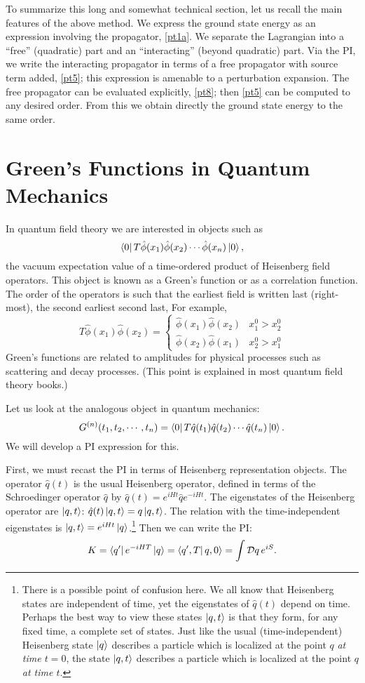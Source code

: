 \documentclass[12pt]{article}
\begin{document}
To summarize this long and somewhat technical
section, let us recall the main features of the
above method. We express the ground state energy as an expression
involving the propagator, \eqref{pt1a}. We separate the Lagrangian into
a ``free'' (\ie quadratic) part and an ``interacting'' (beyond
quadratic) part. Via the PI,
we write the interacting propagator in terms of a
free propagator with source term added, \eqref{pt5}; this expression
is amenable to a perturbation expansion. The free propagator can be
evaluated explicitly, \eqref{pt8}; then \eqref{pt5}
can be computed to any desired order. From this we obtain directly
the ground state energy to the same order.

\section{Green's Functions in Quantum Mechanics}

In quantum field theory we are interested in objects such as
\[
\left\langle0\right|T\hat\phi(x_1)\hat\phi(x_2)\cdots\hat\phi(x_n)\left|0\right\rangle,
\]
the vacuum expectation value of a time-ordered product of Heisenberg
field operators. This object is known as a Green's function or as a
correlation function. The order of the operators is such that the
earliest field is written last (right-most), the second earliest
second last, \etc For example,
\[ T\hat\phi(x_1)\hat\phi(x_2)=\left\{\begin{array}{rl}
\hat\phi(x_1)\hat\phi(x_2)&x_1^0>x_2^0\\
\hat\phi(x_2)\hat\phi(x_1)&x_2^0>x_1^0\end{array}\right.
\]
Green's functions are related to amplitudes for physical processes
such as scattering and decay processes. (This point is explained in
most quantum field theory books.)

Let us look at the analogous object in quantum mechanics:
\[ G^{(n)}(t_1,t_2,\cdots,t_n)=\left\langle0\right|
T\hat q(t_1)\hat q(t_2)\cdots\hat q(t_n)\left|0\right\rangle.
\]
We will develop a PI expression for this. 

First, we must recast the PI
in terms of Heisenberg representation objects. The operator
$\hat q(t)$ is the usual Heisenberg operator, defined in terms of the
Schroedinger operator $\hat q$ by
$\hat q(t)=e^{iHt}\hat q e^{-iHt}$. The eigenstates of the Heisenberg
operator are $\left|q,t\right\rangle$: $\hat q(t)\left|q,t\right\rangle=q\left|q,t\right\rangle$. The
relation with the time-independent eigenstates is
$\left|q,t\right\rangle=e^{iHt}\left|q\right\rangle$.\footnote{There is a possible point of
  confusion here. We all know that Heisenberg states are independent of
  time, yet the eigenstates of $\hat q(t)$ depend on time. Perhaps the
  best way to
  view these states $\left|q,t\right\rangle$ is that they form, for any fixed time, a
  complete set of states. Just like the usual (time-independent)
  Heisenberg state $\left|q\right\rangle$ describes a
  particle which is localized
  at the point $q$ {\em at time $t=0$}, the state $\left|q,t\right\rangle$
  describes a particle which is localized
  at the point $q$ {\em at time $t$}.} Then we
can write the PI:
\[
K=\bra{q'}e^{-iHT}\ket{q}=\bra{q',T}q,0\rangle=
\int\DD q\,e^{iS}.
\]
\end{document}
